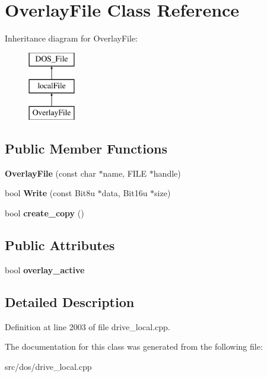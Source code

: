 \hypertarget{classOverlayFile}{\section{Overlay\-File Class Reference}
\label{classOverlayFile}
}
Inheritance diagram for Overlay\-File\-:\begin{figure}[H]
\begin{center}
\leavevmode
\includegraphics[height=3.000000cm]{classOverlayFile}
\end{center}
\end{figure}
\subsection*{Public Member Functions}
\begin{DoxyCompactItemize}
\item 
\hypertarget{classOverlayFile_a781f54204f11e370bb93c9760a35daaf}{{\bfseries Overlay\-File} (const char $\ast$name, F\-I\-L\-E $\ast$handle)}\label{classOverlayFile_a781f54204f11e370bb93c9760a35daaf}

\item 
\hypertarget{classOverlayFile_af15c5d5156e74e1de06de014f81fc4f4}{bool {\bfseries Write} (const Bit8u $\ast$data, Bit16u $\ast$size)}\label{classOverlayFile_af15c5d5156e74e1de06de014f81fc4f4}

\item 
\hypertarget{classOverlayFile_a387334a58e1c704513fe64c2f37276e1}{bool {\bfseries create\-\_\-copy} ()}\label{classOverlayFile_a387334a58e1c704513fe64c2f37276e1}

\end{DoxyCompactItemize}
\subsection*{Public Attributes}
\begin{DoxyCompactItemize}
\item 
\hypertarget{classOverlayFile_a79b9126a09a1cf9d047874cbde21db4b}{bool {\bfseries overlay\-\_\-active}}\label{classOverlayFile_a79b9126a09a1cf9d047874cbde21db4b}

\end{DoxyCompactItemize}


\subsection{Detailed Description}


Definition at line 2003 of file drive\-\_\-local.\-cpp.



The documentation for this class was generated from the following file\-:\begin{DoxyCompactItemize}
\item 
src/dos/drive\-\_\-local.\-cpp\end{DoxyCompactItemize}
